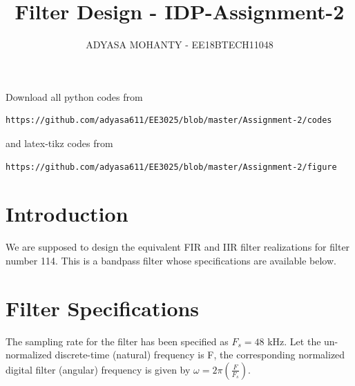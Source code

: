 \documentclass[journal,12pt,twocolumn]{IEEEtran}
\begin{document}
     \def\rightbox#1{\makebox[0in][r]{#1}}
     \def\centbox#1{\makebox[0in]{#1}}
     \def\topbox#1{\raisebox{-\baselineskip}[0in][0in]{#1}}
     \def\midbox#1{\raisebox{-0.5\baselineskip}[0in][0in]{#1}}
\vspace{3cm}
\title{Filter Design - IDP-Assignment-2}
\author{ADYASA MOHANTY - EE18BTECH11048}
\maketitle
\newpage
\bigskip
\renewcommand{\thefigure}{\theenumi}
\renewcommand{\thetable}{\theenumi}
Download all python codes from 
\begin{lstlisting}
https://github.com/adyasa611/EE3025/blob/master/Assignment-2/codes
\end{lstlisting}
%
and latex-tikz codes from 
%
\begin{lstlisting}
https://github.com/adyasa611/EE3025/blob/master/Assignment-2/figure
\end{lstlisting}
\section{Introduction}
We are supposed to design the equivalent FIR and IIR filter realizations for filter number 114.  
This is a bandpass filter whose specifications are available below.
\section{Filter Specifications}
The sampling rate for the filter has been specified as $F_s =  48$ kHz. Let the un-normalized  discrete-time (natural) frequency is F, the corresponding normalized digital filter (angular) frequency is given by $\omega = 2\pi
\left(\frac{F}{F_s}\right)$.
\end{document}
